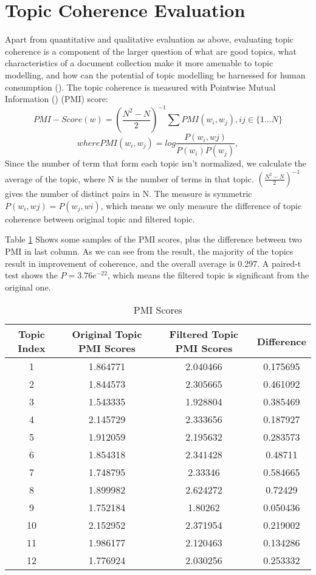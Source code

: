 \documentclass[11pt,twoside]{report}
\begin{document}
\section{Topic Coherence Evaluation}
Apart from quantitative and qualitative evaluation as above, evaluating topic coherence is a component of the larger question of what are good topics, what characteristics of a document collection make it more amenable to topic modelling, and how can the potential of topic modelling be harnessed for human consumption (\cite{ref27}). The topic coherence is measured with Pointwise Mutual Information (\cite{ref32}) (PMI) score:
\begin{equation}
PMI-Score(w) = (\frac{N^{2}-N}{2})^{-1}\sum PMI(w_{i}, w_{j}), ij\in \{1...N\}
\end{equation}
\begin{equation}
where PMI(w_{i}, w_{j}) = log \frac{P(w_{i}, w{j})}{P(w_{i})P(w_{j})},
\end{equation}
Since the number of term that form each topic isn't normalized, we calculate the average of the topic, where N is the number of terms in that topic. $(\frac{N^{2}-N}{2})^{-1}$ gives the number of distinct pairs in N.
The measure is symmetric $P(w_{i}, w{j}) = P(w_{j}, w{i})$, which means we only measure the difference of topic coherence between original topic and filtered topic.

Table \ref{table:PMIScores} Shows some samples of the PMI scores, plus the difference between two PMI in last column. As we can see from the result, the majority of the topics result in improvement of coherence, and the overall average is 0.297. A paired-t test shows the $P=3.76e^{-22}$, which means the filtered topic is significant from the original one.

\begin{table}[h]
\caption{PMI Scores}
\centering
\begin{tabular}{c c c c}
\hline\hline
Topic Index & Original Topic PMI Scores & Filtered Topic PMI Scores & Difference\\
\hline
1 & 1.864771 & 2.040466 & 0.175695\\
2 & 1.844573 & 2.305665 & 0.461092\\
3 & 1.543335 & 1.928804 & 0.385469\\
4 & 2.145729 & 2.333656 & 0.187927\\
5 & 1.912059 & 2.195632 & 0.283573\\
6 & 1.854318 & 2.341428 & 0.48711\\
7 & 1.748795 & 2.33346 & 0.584665\\
8 & 1.899982 & 2.624272 & 0.72429\\
9 & 1.752184 & 1.80262 & 0.050436\\
10 & 2.152952 & 2.371954 & 0.219002\\
11 & 1.986177 & 2.120463 & 0.134286\\
12 & 1.776924 & 2.030256 & 0.253332\\
\hline
\end{tabular}
\label{table:PMIScores}
\end{table}
\end{document}
